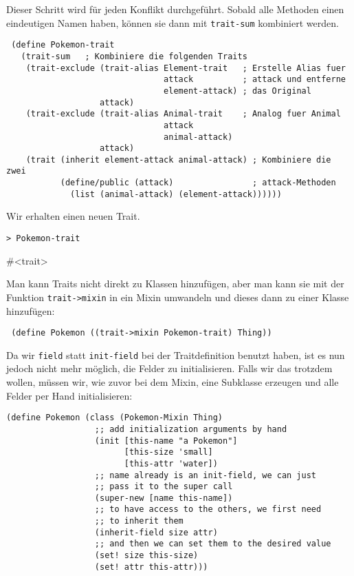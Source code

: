 Dieser Schritt wird für jeden Konflikt durchgeführt. Sobald alle Methoden einen eindeutigen Namen haben, können sie dann mit \texttt{trait-sum} kombiniert werden.

\begin{lstlisting}
 (define Pokemon-trait
   (trait-sum   ; Kombiniere die folgenden Traits
    (trait-exclude (trait-alias Element-trait   ; Erstelle Alias fuer
                                attack          ; attack und entferne
                                element-attack) ; das Original
                   attack)
    (trait-exclude (trait-alias Animal-trait    ; Analog fuer Animal
                                attack         
                                animal-attack)
                   attack)
    (trait (inherit element-attack animal-attack) ; Kombiniere die zwei
           (define/public (attack)                ; attack-Methoden
             (list (animal-attack) (element-attack))))))
\end{lstlisting}

Wir erhalten einen neuen Trait. 

\begin{lstlisting}
> Pokemon-trait
\end{lstlisting}
{\routput \#<trait>}

Man kann Traits nicht direkt zu Klassen hinzufügen, aber man kann sie mit der Funktion \texttt{trait->mixin} in ein Mixin umwandeln und dieses dann zu einer Klasse hinzufügen:

\begin{lstlisting}
 (define Pokemon ((trait->mixin Pokemon-trait) Thing))
\end{lstlisting}

Da wir \texttt{field} statt \texttt{init-field} bei der Traitdefinition benutzt haben, ist es nun jedoch nicht mehr möglich, die Felder zu initialisieren. Falls wir das trotzdem wollen, müssen wir, wie zuvor bei dem Mixin, eine Subklasse erzeugen und alle Felder per Hand initialisieren:

\begin{lstlisting}
(define Pokemon (class (Pokemon-Mixin Thing)
                  ;; add initialization arguments by hand
                  (init [this-name "a Pokemon"]
                        [this-size 'small]
                        [this-attr 'water])
                  ;; name already is an init-field, we can just
                  ;; pass it to the super call
                  (super-new [name this-name])
                  ;; to have access to the others, we first need
                  ;; to inherit them
                  (inherit-field size attr)
                  ;; and then we can set them to the desired value
                  (set! size this-size)
                  (set! attr this-attr)))
\end{lstlisting}

